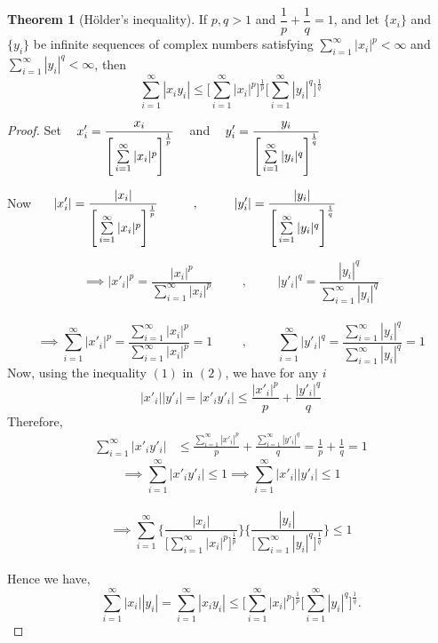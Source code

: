 \documentclass[11pt,a4paper]{article}
\theoremstyle{definition}
\newtheorem{thm}{Theorem}[section]
\begin{document}
\begin{thm}[H\"older's inequality]

If $p,q>1$ and $\dfrac{1}{p}+\dfrac{1}{q}=1$, and let $\{x_i\}$ and $\{y_i\}$ be infinite sequences of complex numbers satisfying $\sum\limits^{\infty}_{i=1}|x_i|^p<\infty$ and $\sum\limits^{\infty}_{i=1}|y_i|^q<\infty$, then \begin{equation}\sum^{\infty}_{i=1}|x_iy_i|\leq \Bigg[\sum^{\infty}_{i=1}|x_i|^p\Bigg]^{\frac{1}{p}}\Bigg[\sum^{\infty}_{i=1}|y_i|^q\Bigg]^{\frac{1}{q}}\tag{2}\end{equation}


\end{thm}

\begin{proof}

Set $\hspace{0.3cm} \displaystyle{x'_i=\frac{x_i}{\Bigg[\sum\limits^{\infty}_{i=1}|x_i|^p\Bigg]^{\frac{1}{p}}}}\hspace{0.3cm}$ and $\hspace{0.3cm} \displaystyle{y'_i=\frac{y_i}{\Bigg[\sum\limits^{\infty}_{i=1}|y_i|^q\Bigg]^{\frac{1}{q}}}}$

 
Now $\hspace{0.5cm}\displaystyle{|x'_i|=\frac{|x_i|}{\Bigg[\sum\limits^{\infty}_{i=1}|x_i|^p\Bigg]^{\frac{1}{p}}}\hspace{1cm},\hspace{1cm} |y'_i|=\frac{|y_i|}{\Bigg[\sum\limits^{\infty}_{i=1}|y_i|^q\Bigg]^{\frac{1}{q}}}}$

 
$$\implies |x'_i|^p=\frac{|x_i|^p}{\sum\limits^{\infty}_{i=1}|x_i|^p}\hspace{1cm},\hspace{1cm} |y'_i|^q =\frac{|y_i|^q}{\sum\limits^{\infty}_{i=1}|y_i|^q}$$\\ $$\implies \sum^{\infty}_{i=1}|x'_i|^p=\frac{\sum\limits^{\infty}_{i=1}|x_i|^p}{\sum\limits^{\infty}_{i=1}|x_i|^p}=1\hspace{1cm},\hspace{1cm}\sum^{\infty}_{i=1}|y'_i|^q=\frac{\sum\limits^{\infty}_{i=1}|y_i|^q}{\sum\limits^{\infty}_{i=1}|y_i|^q}=1$$ Now, using the inequality $(1)$ in $(2)$, we have for any $i$ $$|x'_i||y'_i|=|x'_iy'_i|\leq \frac{|x'_i|^p}{p}+\frac{|y'_i|^q}{q}$$ Therefore,
\begin{align*}
\sum_{i=1}^{\infty}|x'_iy'_i| &\leq \frac{\sum\limits^{\infty}_{i=1}|x'_i|^p}{p}+\frac{\sum\limits^{\infty}_{i=1}|y'_i|^q}{q}
                              =\frac{1}{p}+\frac{1}{q}
                              =1
\end{align*}
$$\implies \sum^{\infty}_{i=1}|x'_iy'_i|\leq 1\implies \sum^{\infty}_{i=1}|x'_i||y'_i|\leq 1$$\\ $$\implies \sum_{i=1}^{\infty}\Bigg\{\frac{|x_i|}{\Big[\sum\limits^{\infty}_{i=1}|x_i|^p\Big]^{\frac{1}{p}}}\Bigg\} \Bigg\{\frac{|y_i|}{\Big[\sum\limits^{\infty}_{i=1}|y_i|^q\Big]^{\frac{1}{q}}}\Bigg\} \leq 1$$\\ Hence we have,$$\sum^{\infty}_{i=1}|x_i||y_i|=\sum^{\infty}_{i=1}|x_iy_i|\leq \Bigg[\sum^{\infty}_{i=1}|x_i|^p\Bigg]^{\frac{1}{p}}\Bigg[\sum^{\infty}_{i=1}|y_i|^q\Bigg]^{\frac{1}{q}}.$$


\end{proof}
\end{document}
